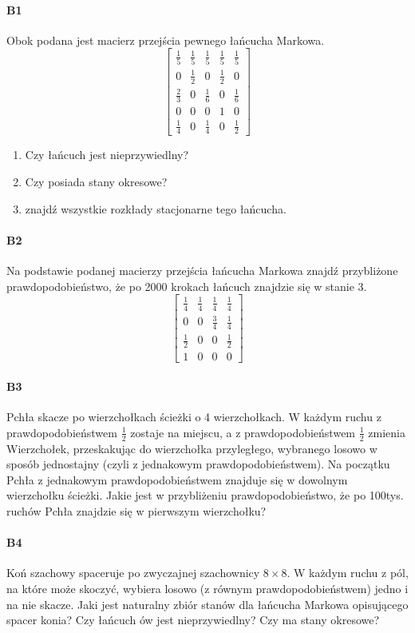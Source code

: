 \paragraph{B1} Obok podana jest macierz przejścia pewnego łańcucha Markowa.
$$\begin{bmatrix}
\frac{1}{5}&\frac{1}{5}&\frac{1}{5}&\frac{1}{5}&\frac{1}{5}\\
0&\frac{1}{2}&0&\frac{1}{2}&0\\
\frac{2}{3}&0&\frac{1}{6}&0&\frac{1}{6}\\
0&0&0&1&0\\
\frac{1}{4}&0&\frac{1}{4}&0&\frac{1}{2}
\end{bmatrix}$$
\begin{enumerate}[label=\alph*)]
\item Czy łańcuch jest nieprzywiedlny?
\item Czy posiada stany okresowe?
\item znajdź wszystkie rozkłady stacjonarne tego łańcucha.
\end{enumerate}

\paragraph{B2} Na podstawie podanej macierzy przejścia łańcucha Markowa znajdź przybliżone
prawdopodobieństwo, że po 2000 krokach łańcuch znajdzie się w stanie 3.
$$\begin{bmatrix}
\frac{1}{4}&\frac{1}{4}&\frac{1}{4}&\frac{1}{4}\\
0&0&\frac{3}{4}&\frac{1}{4}\\
\frac{1}{2}&0&0&\frac{1}{2}\\
1&0&0&0
\end{bmatrix}$$

\paragraph{B3} Pchła skacze po wierzchołkach ścieżki o 4 wierzchołkach. W każdym ruchu z prawdopodobieństwem $\frac{1}{2}$ zostaje na miejscu, a z prawdopodobieństwem $\frac{1}{2}$ zmienia Wierzchołek, przeskakując do wierzchołka przyległego, wybranego losowo w sposób jednostajny (czyli z jednakowym prawdopodobieństwem). Na początku Pchła z jednakowym prawdopodobieństwem znajduje się w dowolnym wierzchołku ścieżki. Jakie jest w przybliżeniu prawdopodobieństwo, że po 100tys. ruchów Pchła znajdzie się w pierwszym wierzchołku?

\paragraph{B4} Koń szachowy spaceruje po zwyczajnej szachownicy $8\times 8$. W każdym ruchu z pól, na które może skoczyć, wybiera losowo (z równym prawdopodobieństwem) jedno i na nie skacze. Jaki jest naturalny zbiór stanów dla łańcucha Markowa opisującego spacer konia? Czy łańcuch ów jest nieprzywiedlny? Czy ma stany okresowe?

